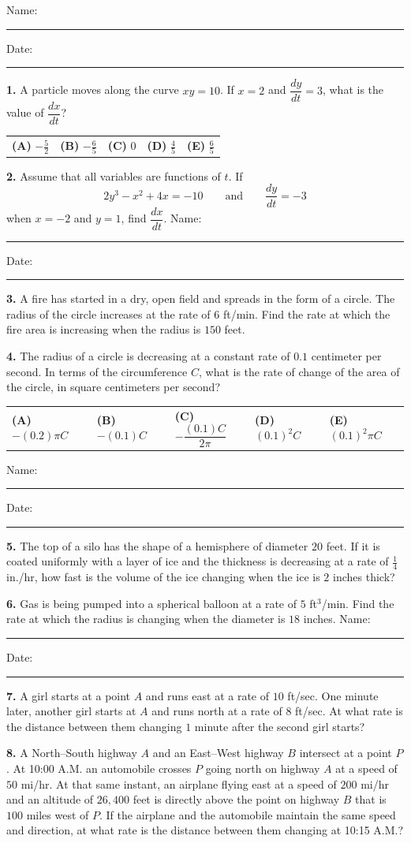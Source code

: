 \documentclass[11pt]{article}
\makeatletter
\newcommand{\wsM}{\vspace*{4.5cm}}
\newcommand{\prob}[1]{\par\noindent\textbf{#1.}\quad}
\newcommand{\choices}[5]{\par\medskip\noindent\begin{tabular*}{\linewidth}{@{\extracolsep{\fill}}lllll}\textbf{(A)} #1&\textbf{(B)} #2&\textbf{(C)} #3&\textbf{(D)} #4&\textbf{(E)} #5\end{tabular*}\par}
\makeatother
\begin{document}
\noindent Name: \rule{2.7in}{0.4pt}\hfill Date: \rule{1.3in}{0.4pt}\par\bigskip
\prob{1} A particle moves along the curve $xy=10$. If $x=2$ and $\dfrac{dy}{dt}=3$, what is the value of $\dfrac{dx}{dt}$?
\choices{$-\frac52$}{$-\frac65$}{$0$}{$\frac45$}{$\frac65$}
\wsM
\vfill
\prob{2} Assume that all variables are functions of $t$. If
\[2y^3-x^2+4x=-10\qquad\text{and}\qquad \frac{dy}{dt}=-3\]
when $x=-2$ and $y=1$, find $\dfrac{dx}{dt}$.
\wsM
\clearpage
\noindent Name: \rule{2.7in}{0.4pt}\hfill Date: \rule{1.3in}{0.4pt}\par\bigskip
\prob{3} A fire has started in a dry, open field and spreads in the form of a circle. The radius of the circle increases at the rate of $6$ ft/min. Find the rate at which the fire area is increasing when the radius is $150$ feet.
\wsM
\vfill
\prob{4} The radius of a circle is decreasing at a constant rate of $0.1$ centimeter per second. In terms of the circumference $C$, what is the rate of change of the area of the circle, in square centimeters per second?
\choices{$-(0.2)\pi C$}{$-(0.1)C$}{$-\dfrac{(0.1)C}{2\pi}$}{$(0.1)^2C$}{$(0.1)^2\pi C$}
\wsM
\clearpage
\noindent Name: \rule{2.7in}{0.4pt}\hfill Date: \rule{1.3in}{0.4pt}\par\bigskip
\prob{5} The top of a silo has the shape of a hemisphere of diameter $20$ feet. If it is coated uniformly with a layer of ice and the thickness is decreasing at a rate of $\frac14$ in./hr, how fast is the volume of the ice changing when the ice is $2$ inches thick?
\wsM
\vfill
\prob{6} Gas is being pumped into a spherical balloon at a rate of $5$ ft$^3$/min. Find the rate at which the radius is changing when the diameter is $18$ inches.
\wsM
\clearpage
\noindent Name: \rule{2.7in}{0.4pt}\hfill Date: \rule{1.3in}{0.4pt}\par\bigskip
\prob{7} A girl starts at a point $A$ and runs east at a rate of $10$ ft/sec. One minute later, another girl starts at $A$ and runs north at a rate of $8$ ft/sec. At what rate is the distance between them changing $1$ minute after the second girl starts?
\wsM
\vfill
\prob{8} A North--South highway $A$ and an East--West highway $B$ intersect at a point $P$. At 10:00 A.M. an automobile crosses $P$ going north on highway $A$ at a speed of $50$ mi/hr. At that same instant, an airplane flying east at a speed of $200$ mi/hr and an altitude of $26{,}400$ feet is directly above the point on highway $B$ that is $100$ miles west of $P$. If the airplane and the automobile maintain the same speed and direction, at what rate is the distance between them changing at 10:15 A.M.?
\end{document}
